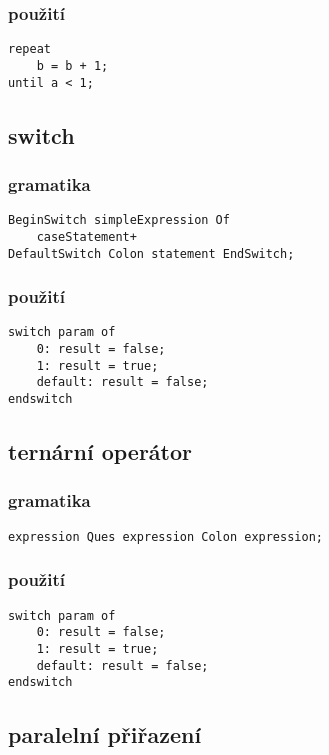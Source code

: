 \documentclass{style}
\begin{document}
\subsubsection{použití}
\begin{lstlisting}
repeat
	b = b + 1;
until a < 1;
\end{lstlisting}

\subsection{switch}
\subsubsection{gramatika}
\begin{lstlisting}
BeginSwitch simpleExpression Of 
	caseStatement+ 
DefaultSwitch Colon statement EndSwitch;
\end{lstlisting}

\subsubsection{použití}
\begin{lstlisting}
switch param of
    0: result = false;
    1: result = true;
    default: result = false;
endswitch
\end{lstlisting}

\subsection{ternární operátor}
\subsubsection{gramatika}
\begin{lstlisting}
expression Ques expression Colon expression;
\end{lstlisting}

\subsubsection{použití}
\begin{lstlisting}
switch param of
    0: result = false;
    1: result = true;
    default: result = false;
endswitch
\end{lstlisting}

\subsection{paralelní přiřazení}
\end{document}
